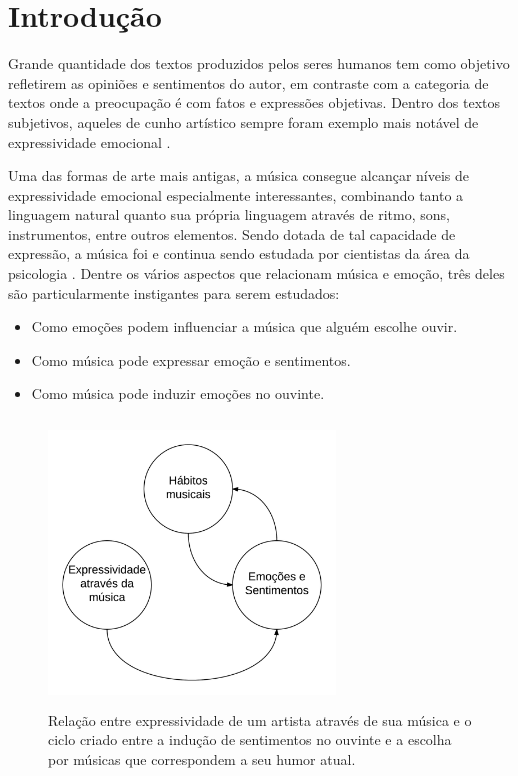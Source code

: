 \section{Introdução}


Grande quantidade dos textos produzidos pelos seres humanos tem como
objetivo refletirem as opiniões e sentimentos do autor, em contraste
com a categoria de textos onde a preocupação é com fatos e expressões
objetivas. Dentro dos textos subjetivos, aqueles de cunho artístico sempre foram exemplo mais notável de expressividade emocional
\cite{PJA57}.


Uma das formas de arte mais antigas, a música consegue alcançar
níveis de expressividade emocional especialmente interessantes, 
combinando tanto a linguagem natural quanto sua própria linguagem
através de ritmo, sons, instrumentos, entre outros elementos. Sendo
dotada de tal capacidade de expressão, a música foi e continua
sendo estudada por cientistas da área da psicologia
\cite{juslin2001music} \cite{citeulike:12758145}
\cite{Aaltodoc:201705114245}. Dentre os 
vários aspectos que relacionam música e emoção, três deles são
particularmente instigantes para serem estudados:

\begin{itemize}
	\item Como emoções podem influenciar a música que alguém escolhe
	ouvir.
	\item Como música pode expressar emoção e sentimentos.
	\item Como música pode induzir emoções no ouvinte. 
\end{itemize}

\begin{figure}
\includegraphics[height=3in, width=3in]{music-mood.png}
\caption{Relação entre expressividade de um artista através de sua música
	e o ciclo criado entre a indução de sentimentos no ouvinte e a escolha
	por músicas que correspondem a seu humor atual.}
\label{fig:music-mood}
\end{figure}

